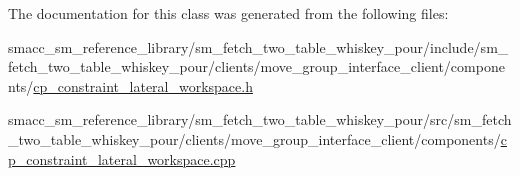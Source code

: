 The documentation for this class was generated from the following files\+:\begin{DoxyCompactItemize}
\item 
smacc\+\_\+sm\+\_\+reference\+\_\+library/sm\+\_\+fetch\+\_\+two\+\_\+table\+\_\+whiskey\+\_\+pour/include/sm\+\_\+fetch\+\_\+two\+\_\+table\+\_\+whiskey\+\_\+pour/clients/move\+\_\+group\+\_\+interface\+\_\+client/components/\hyperlink{sm__fetch__two__table__whiskey__pour_2include_2sm__fetch__two__table__whiskey__pour_2clients_2mo6fb23b4c37fbe0a9afd4864c1fabea9e}{cp\+\_\+constraint\+\_\+lateral\+\_\+workspace.\+h}\item 
smacc\+\_\+sm\+\_\+reference\+\_\+library/sm\+\_\+fetch\+\_\+two\+\_\+table\+\_\+whiskey\+\_\+pour/src/sm\+\_\+fetch\+\_\+two\+\_\+table\+\_\+whiskey\+\_\+pour/clients/move\+\_\+group\+\_\+interface\+\_\+client/components/\hyperlink{sm__fetch__two__table__whiskey__pour_2src_2sm__fetch__two__table__whiskey__pour_2clients_2move__64789164897b910e95ab0e0910505529}{cp\+\_\+constraint\+\_\+lateral\+\_\+workspace.\+cpp}\end{DoxyCompactItemize}
